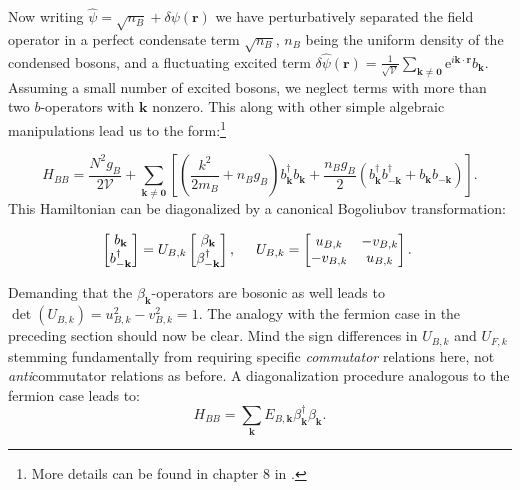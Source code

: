 Now writing $\hat{\psi} = \sqrt{n_B} + \delta \psi(\mathbf{r})$ we have perturbatively separated the field operator in a perfect condensate term $\sqrt{n_B}$, $n_B$ being the uniform density of the condensed bosons, and a fluctuating excited term $\delta \hat{\psi}(\mathbf{r}) =  \frac{1}{\sqrt{\mathcal{V}}}\sum_{\mathbf{k}\neq \mathbf{0}} \text{e}^{i\mathbf{k}\cdot\mathbf{r}}b_\mathbf{k}$. Assuming a small number of excited bosons, we neglect terms with more than two $b$-operators with $\mathbf{k}$ nonzero. This along with other simple algebraic manipulations lead us to the form:\footnote{More details can be found in chapter 8 in \cite{Pethick}.} 

\begin{equation}
H_{BB} = \frac{N^2g_B}{2\mathcal{V}} + \sum_{\mathbf{k}\neq \mathbf{0}}\left[\left(\frac{k^2}{2m_B}+n_Bg_B\right)b_\mathbf{k}^\dagger b_\mathbf{k} + \frac{n_Bg_B}{2}\left( b_\mathbf{k}^\dagger b_{-\mathbf{k}}^\dagger + b_{\mathbf{k}} b_{-\mathbf{k}} \right) \right].
\label{eq.bosonHamiltonian}
\end{equation}
This Hamiltonian can be diagonalized by a canonical Bogoliubov transformation:

\begin{equation}
\begin{bmatrix} b_\mathbf{k} \\ b^\dagger_{-\mathbf{k}} \end{bmatrix} = U_{B,k} \begin{bmatrix} \beta_\mathbf{k} \\ \beta^\dagger_{-\mathbf{k}}\end{bmatrix}, \hspace{0.5cm} U_{B,k} = \begin{bmatrix} u_{B,k} & -v_{B,k} \\ -v_{B,k} & u_{B,k} \end{bmatrix}. 
\end{equation}

Demanding that the $\beta_\mathbf{k}$-operators are bosonic as well leads to $\det(U_{B,k}) = u_{B,k}^2-v_{B,k}^2=1$. The analogy with the fermion case in the preceding section should now be clear. Mind the sign differences in $U_{B,k}$ and $U_{F,k}$ stemming fundamentally from requiring specific \textit{commutator} relations here, not \textit{anti}commutator relations as before. A diagonalization procedure analogous to the fermion case leads to: 
\begin{equation}
H_{BB} = \sum_\mathbf{k} E_{B,\mathbf{k}}\beta_\mathbf{k}^\dagger \beta_\mathbf{k}. 
\end{equation}

